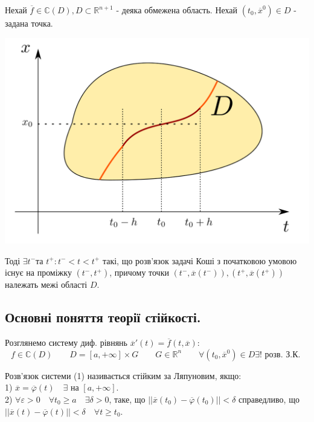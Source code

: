 \documentclass[14pt,a4paper]{scrartcl}
\theoremstyle{definition}
\theoremstyle{remark}
\theoremstyle{definition}
\theoremstyle{definition}
\begin{document}
\begin{boxteo}
    Нехай $\overline{f} \in \mathbb{C}(D), D \subset \mathbb{R}^{n+1}$ - деяка обмежена область. Нехай $(t_0, \overline{x}^0) \in D$ - задана точка.

    \begin{center} \includegraphics[scale=0.27]{assets/lectures-d0fd0868.png} \end{center}
    Тоді $\exists t^{-} $та  $t^{+} :  t^{-} < t < t^{+}$ такі, що розв'язок задачі Коші з початковою умовою існує на проміжку $ (t^{-}, t^{+})$, причому точки $ (t^-, \overline{x} (t^-)), (t^+, \overline{x} (t^+))$ належать межі області $D$.
\end{boxteo}
\subsection{Основні поняття теорії стійкості.}
Розглянемо систему диф. рівнянь $\overline{x}'(t) = \overline{f} (t, \overline{x})$:
$$f \in   \mathbb{C}(D)\qquad D = [a, +\infty ]  \times G\qquad G \in \mathbb{R}^{n} \qquad  \forall (t_0, \overline{x}^0) \in D  \exists! \text{ розв. З.К. } $$

\bd Розв'язок системи (1) називається стійким за Ляпуновим, якщо:\\
1) $\overline{x} = \overline{\varphi } (t)  \quad \exists$ на $[a, +\infty]$.\\
2) $\forall \varepsilon > 0 \quad \forall t_0 \geq a \quad \exists \delta > 0$, таке, що $ \left|\left| \overline{x}(t_0) - \overline{\varphi}(t_0) \right|\right| < \delta $ справедливо, що $ \left| \left|
\overline{x} (t) - \overline{\varphi} (t)
  \right|  \right|  < \delta  \quad \forall t \geq t_0$.
\ed
\end{document}
